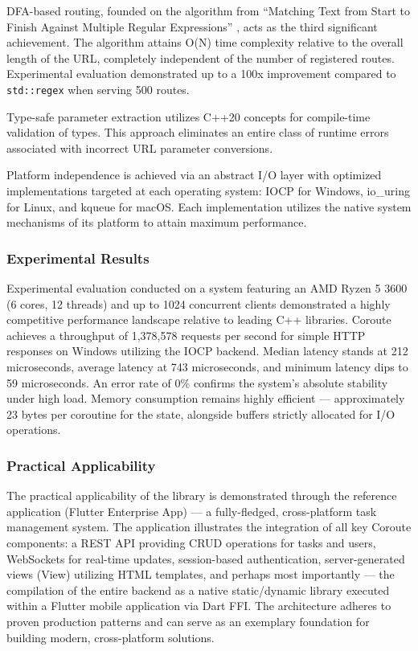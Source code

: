 DFA-based routing, founded on the algorithm from ``Matching Text from Start to Finish Against Multiple Regular Expressions'' \cite{stankov2024regex}, acts as the third significant achievement. The algorithm attains O(N) time complexity relative to the overall length of the URL, completely independent of the number of registered routes. Experimental evaluation demonstrated up to a 100x improvement compared to \texttt{std::regex} when serving 500 routes.

Type-safe parameter extraction utilizes C++20 concepts for compile-time validation of types. This approach eliminates an entire class of runtime errors associated with incorrect URL parameter conversions.

Platform independence is achieved via an abstract I/O layer with optimized implementations targeted at each operating system: IOCP for Windows, io\_uring for Linux, and kqueue for macOS. Each implementation utilizes the native system mechanisms of its platform to attain maximum performance.

\subsubsection{Experimental Results}

Experimental evaluation conducted on a system featuring an AMD Ryzen 5 3600 (6 cores, 12 threads) and up to 1024 concurrent clients demonstrated a highly competitive performance landscape relative to leading C++ libraries. Coroute achieves a throughput of 1,378,578 requests per second for simple HTTP responses on Windows utilizing the IOCP backend. Median latency stands at 212 microseconds, average latency at 743 microseconds, and minimum latency dips to 59 microseconds. An error rate of 0\% confirms the system's absolute stability under high load. Memory consumption remains highly efficient --- approximately 23 bytes per coroutine for the state, alongside buffers strictly allocated for I/O operations.

\subsubsection{Practical Applicability}

The practical applicability of the library is demonstrated through the reference application (Flutter Enterprise App) --- a fully-fledged, cross-platform task management system. The application illustrates the integration of all key Coroute components: a REST API providing CRUD operations for tasks and users, WebSockets for real-time updates, session-based authentication, server-generated views (View) utilizing HTML templates, and perhaps most importantly --- the compilation of the entire backend as a native static/dynamic library executed within a Flutter mobile application via Dart FFI. The architecture adheres to proven production patterns and can serve as an exemplary foundation for building modern, cross-platform solutions.


